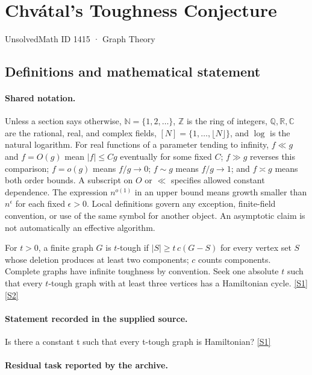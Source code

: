 \documentclass[11pt,a4paper]{article}
\newcommand{\N}{\mathbb{N}}
\newcommand{\Z}{\mathbb{Z}}
\newcommand{\Q}{\mathbb{Q}}
\newcommand{\R}{\mathbb{R}}
\newcommand{\C}{\mathbb{C}}
\newcommand{\sref}[2]{\hyperlink{source:#1:#2}{[S#2]}}
\begin{document}

\setcounter{section}{1414}

\section{Chvátal’s Toughness Conjecture}\label{1415}

{\small\sffamily UnsolvedMath ID 1415 · Graph Theory}

\subsection{Definitions and mathematical statement}

\paragraph{Shared notation.}Unless a section says otherwise, $\N=\{1,2,\ldots\}$,
$\Z$ is the ring of integers, $\Q,\R,\C$ are the rational, real, and complex
fields, $[N]=\{1,\ldots,\lfloor N\rfloor\}$, and $\log$ is the natural
logarithm. For real functions of a parameter tending to infinity,
$f\ll g$ and $f=O(g)$ mean $|f|\leq Cg$ eventually for some fixed $C$;
$f\gg g$ reverses this comparison; $f=o(g)$ means $f/g\to0$;
$f\sim g$ means $f/g\to1$; and $f\asymp g$ means both order bounds.
A subscript on $O$ or $\ll$ specifies allowed constant dependence.
The expression $n^{o(1)}$ in an upper bound means growth smaller than
$n^\epsilon$ for each fixed $\epsilon>0$. Local definitions govern any
exception, finite-field convention, or use of the same symbol for another
object. An asymptotic claim is not automatically an effective algorithm.



For $t>0$, a finite graph $G$ is $t$-tough if $|S|\geq t\,c(G-S)$ for every vertex set $S$ whose deletion produces at least two components; $c$ counts components. Complete graphs have infinite toughness by convention. Seek one absolute $t$ such that every $t$-tough graph with at least three vertices has a Hamiltonian cycle. \sref{1415}{1} \sref{1415}{2}

\paragraph{Statement recorded in the supplied source.}
Is there a constant t such that every t-tough graph is Hamiltonian? \sref{1415}{1}

\paragraph{Residual task reported by the archive.}
\end{document}

